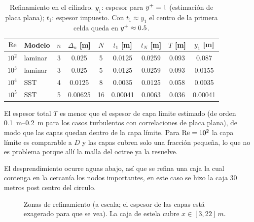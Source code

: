 \begin{table}[H]
\centering
\small
\begin{tabular}{rlccccccc}
\toprule
$\mathrm{Re}$ & Modelo & $n$ & $\Delta_n$ [\si{m}] & $N$ & $t_1$ [\si{m}] & $t_N$ [\si{m}] & $T$ [\si{m}] & $y_1$ [\si{m}] \\
\midrule
$10^{2}$ & laminar & 3 & \num{0.025}   & 5  & \num{0.0125}  & \num{0.0259} & \num{0.093}  & \num{0.087}  \\
$10^{3}$ & laminar & 3 & \num{0.025}   & 5  & \num{0.0125}  & \num{0.0259} & \num{0.093}  & \num{0.0155} \\
$10^{4}$ & SST     & 4 & \num{0.0125}  & 8  & \num{0.0035}  & \num{0.0125} & \num{0.058}  & \num{0.0035} \\
$10^{5}$ & SST     & 5 & \num{0.00625} & 16 & \num{0.00041} & \num{0.0063} & \num{0.036}  & \num{0.00041} \\
\bottomrule
\end{tabular}
\caption{Refinamiento en el cilindro. $y_1$: espesor para $y^{+}=1$ (estimación de placa plana); $t_1$: espesor impuesto. Con $t_1\approx y_1$ el centro de la primera celda queda en $y^{+}\approx0.5$.}
\label{tab:capas}
\end{table}

El espesor total $T$ es menor que el espesor de capa límite estimado (de orden \SIrange{0.1}{0.2}{m} para los casos turbulentos con correlaciones de placa plana), de modo que las capas quedan dentro de la capa límite. Para $\mathrm{Re}=10^{2}$ la capa límite es comparable a $D$ y las capas cubren solo una fracción pequeña, lo que no es problema porque allí la malla del octree ya la resuelve.

El desprendimiento ocurre aguas abajo, así que se refina una caja la cual contenga en la cercanía los nodos importantes, en este caso se hizo la caja 30 metros post centro del circulo.

\begin{figure}[H]
\centering
{}
\caption{Zonas de refinamiento (a escala; el espesor de las capas está exagerado para que se vea). La caja de estela cubre $x\in[3,22]\,\si{m}$.}
\label{fig:zonas}
\end{figure}



